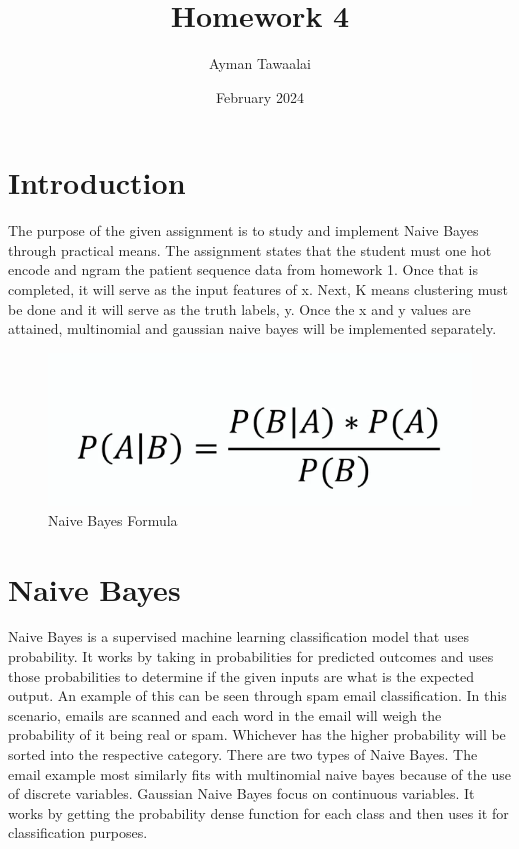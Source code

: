 \documentclass{article}
\title{Homework 4}
\author{Ayman Tawaalai }
\date{February 2024}
\begin{document}
\maketitle

\section{Introduction}
The purpose of the given assignment is to study and implement Naive Bayes through practical means. The assignment states that the student must one hot encode and ngram the patient sequence data from homework 1. Once that is completed, it will serve as the input features of x. Next, K means clustering must be done and it will serve as the truth labels, y. Once the x and y values are attained, multinomial and gaussian naive bayes will be implemented separately.
\begin{figure}
    \centering
    \includegraphics[width=0.5\linewidth]{1.png}
    \caption{Naive Bayes Formula}
    \label{fig:enter-label}
\end{figure}
\section{Naive Bayes}
Naive Bayes is a supervised machine learning classification model that uses probability. It works by taking in probabilities for predicted outcomes and uses those probabilities to determine if the given inputs are what is the expected output. An example of this can be seen through spam email classification. In this scenario, emails are scanned and each word in the email will weigh the probability of it being real or spam. Whichever has the higher probability will be sorted into the respective category. There are two types of Naive Bayes. The email example most similarly fits with multinomial naive bayes because of the use of discrete variables. Gaussian Naive Bayes focus on continuous variables. It works by getting the probability dense function for each class and then uses it for classification purposes.
\end{document}
